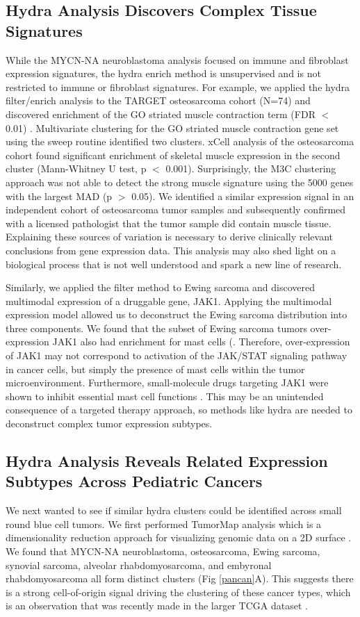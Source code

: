 \documentclass[10pt,letterpaper]{article}
\begin{document}
\subsection{Hydra Analysis Discovers Complex Tissue Signatures}
While the MYCN-NA neuroblastoma analysis focused on immune and fibroblast expression signatures, the hydra enrich method is unsupervised and is not restricted to immune or fibroblast signatures. For example, we applied the hydra filter/enrich analysis to the TARGET osteosarcoma cohort (N=74) and discovered enrichment of the GO striated muscle contraction term (FDR $<$ 0.01) . Multivariate clustering for the GO striated muscle contraction gene set using the sweep routine identified two clusters. xCell analysis of the osteosarcoma cohort found significant enrichment of skeletal muscle expression in the second cluster (Mann-Whitney U test, p $<$ 0.001). Surprisingly, the M3C clustering approach was not able to detect the strong muscle signature using the 5000 genes with the largest MAD (p $>$ 0.05). We identified a similar expression signal in an independent cohort of osteosarcoma tumor samples and subsequently confirmed with a licensed pathologist that the tumor sample did contain muscle tissue. Explaining these sources of variation is necessary to derive clinically relevant conclusions from gene expression data. This analysis may also shed light on a biological process that is not well understood and spark a new line of research. 

Similarly, we applied the filter method to Ewing sarcoma and discovered multimodal expression of a druggable gene, JAK1. Applying the multimodal expression model allowed us to deconstruct the Ewing sarcoma distribution into three components. We found that the subset of Ewing sarcoma tumors over-expression JAK1 also had enrichment for mast cells (. Therefore, over-expression of JAK1 may not correspond to activation of the JAK/STAT signaling pathway in cancer cells, but simply the presence of mast cells within the tumor microenvironment. Furthermore, small-molecule drugs targeting JAK1 were shown to inhibit essential mast cell functions \cite{hermansJAK1JAK2Inhibitor2018}. This may be an unintended consequence of a targeted therapy approach, so methods like hydra are needed to deconstruct complex tumor expression subtypes.

\subsection{Hydra Analysis Reveals Related Expression Subtypes Across Pediatric Cancers}
We next wanted to see if similar hydra clusters could be identified across small round blue cell tumors. We first performed TumorMap analysis which is a dimensionality reduction approach for visualizing genomic data on a 2D surface \cite{newtonTumorMapExploringMolecular2017}. We found that MYCN-NA neuroblastoma, osteosarcoma, Ewing sarcoma, synovial sarcoma, alveolar rhabdomyosarcoma, and embyronal rhabdomyosarcoma all form distinct clusters (Fig \ref{pancan}A). This suggests there is a strong cell-of-origin signal driving the clustering of these cancer types, which is an observation that was recently made in the larger TCGA dataset \cite{Hoadley2014}. 
\end{document}
